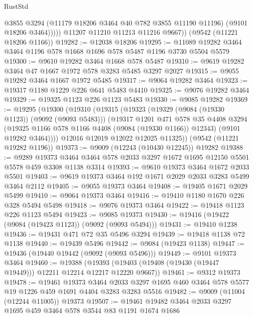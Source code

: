 \begin{lexlean}{RustStd}
\begin{coremodule}
                @3855
                @3294
                (@11179 @18206 @3464 @40 @782 @3855 @11190 @11196)
                (@9101 @18206 @3464)))))
        @11207
        @11210
        @11213
        @11216
        @9667))
    (@9542 (@11221 @18206 @1166))
@19282 := @12038 @18206
@19295 := @11089 @19282 @3464 @3464 @1196 @578 @1668 @1696 @578 @5487 @1196 @3730 @5504 @5579
@19300 := @9610 @19282 @3464 @1668 @578 @5487
@19310 := @9619 @19282 @3464 @47 @1667 @1972 @578 @3283 @5485 @3297 @2027
@19315 := @9055 @19282 @3464 @1667 @1972 @5485
@19317 := @9064 @19282 @3464
@19323 := @19317 @1180 @1229 @226 @641 @5483 @4410
@19325 := @9076 @19282 @3464
@19329 := @19325 @1123 @226 @1123 @5483
@19330 := @9085 @19282
@19369 := @19295
    (@19300
      (@19310
        (@19315
          (@19323
            (@19329 (@9084 (@19330 @1123)) (@9092 (@9093 @5483)))
            (@19317
              @1201
              @471
              @578
              @35
              @4408
              @3294
              (@19325 @1166 @578 @1166 @4408 (@9084 (@19330 @1166)) @12343)
              (@9101 @19282 @3464))))
        @12016
        @12019
        @12022
        @12025
        @11325))
    (@9542 (@11221 @19282 @1196))
@19373 := @9009 (@12243 (@10430 @12245)) @19282
@19388 := @9289
    @19373
    @3464
    @3464
    @578
    @2033
    @3297
    @1672
    @1695
    @12150
    @5501
    @5578
    @459
    @3308
    @1138
    @3314
@19393 := @9610 @19373 @3464 @1672 @2033 @5501
@19403 := @9619 @19373 @3464 @192 @1671 @2029 @2033 @3283 @5499 @3464 @2112
@19405 := @9055 @19373 @3464
@19408 := @19405 @1671 @2029 @5499
@19410 := @9064 @19373 @3464
@19416 := @19410 @1180 @1670 @226 @328 @5494 @5498
@19418 := @9076 @19373 @3464
@19422 := @19418 @1123 @226 @1123 @5494
@19423 := @9085 @19373
@19430 := @19416 (@19422 (@9084 (@19423 @1123)) (@9092 (@9093 @5494)))
@19431 := @19410 @1238
@19436 := @19431 @471 @72 @35 @5496 @3294
@19439 := @19418 @1138 @72 @1138
@19440 := @19439 @5496
@19442 := @9084 (@19423 @1138)
@19447 := @19436 (@19440 @19442 (@9092 (@9093 @5496)))
@19449 := @9101 @19373 @3464
@19460 := @19388
    (@19393 (@19403 (@19408 (@19430 (@19447 @19449))) @12211 @12214 @12217 @12220 @9667))
@19461 := @9312 @19373
@19478 := @19461
    @19373
    @3464
    @2033
    @3297
    @1695
    @460
    @3464
    @578
    @5577
    @19
    @1226
    @459
    @1691
    @4404
    @3283
    @3283
    @5516
@19482 := @9009 (@11004 (@12244 @11005)) @19373
@19507 := @19461
    @19482
    @3464
    @2033
    @3297
    @1695
    @459
    @3464
    @578
    @3544
    @83
    @1191
    @1674
    @1686

\end{coremodule}
\end{lexlean}
